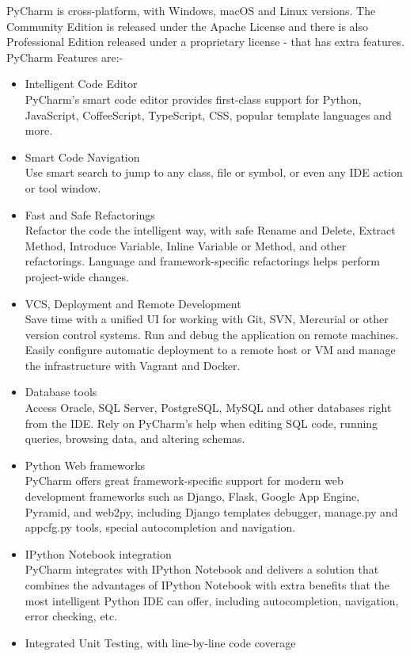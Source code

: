 PyCharm is cross-platform, with Windows, macOS and Linux versions. The Community Edition is released under the Apache License and there is also Professional Edition released under a proprietary license - that has extra features.
\newpage
\noindent PyCharm Features are:-
\begin{itemize}
	\item Intelligent Code Editor\\PyCharm’s smart code editor provides first-class support for Python, JavaScript, CoffeeScript, TypeScript, CSS, popular template languages and more.
	\item Smart Code Navigation\\Use smart search to jump to any class, file or symbol, or even any IDE action or tool window.
	\item Fast and Safe Refactorings\\Refactor the code the intelligent way, with safe Rename and Delete, Extract Method, Introduce Variable, Inline Variable or Method, and other refactorings. Language and framework-specific refactorings helps perform project-wide changes.
	\item VCS, Deployment and Remote Development\\Save time with a unified UI for working with Git, SVN, Mercurial or other version control systems. Run and debug the application on remote machines. Easily configure automatic deployment to a remote host or VM and manage the infrastructure with Vagrant and Docker.
	\item Database tools\\Access Oracle, SQL Server, PostgreSQL, MySQL and other databases right from the IDE. Rely on PyCharm’s help when editing SQL code, running queries, browsing data, and altering schemas.
	\item Python Web frameworks\\PyCharm offers great framework-specific support for modern web development frameworks such as Django, Flask, Google App Engine, Pyramid, and web2py, including Django templates debugger, manage.py and appcfg.py tools, special autocompletion and navigation.
	\item IPython Notebook integration\\PyCharm integrates with IPython Notebook and delivers a solution that combines the advantages of IPython Notebook with extra benefits that the most intelligent Python IDE can offer, including autocompletion, navigation, error checking, etc.
	\item Integrated Unit Testing, with line-by-line code coverage
\end{itemize}
\newpage
